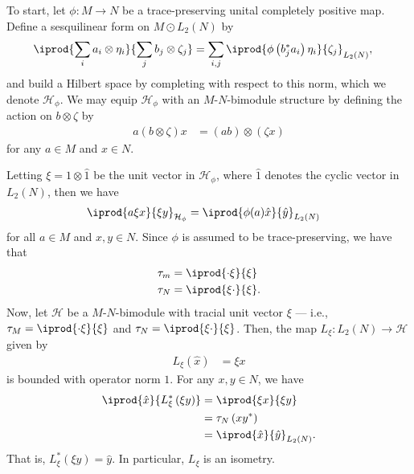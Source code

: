 \documentclass[10pt]{mypackage}
\begin{document}
To start, let $\phi\colon M\rightarrow N$ be a trace-preserving unital completely positive map. Define a sesquilinear form on $M\odot L_2\left( N \right)$ by
\begin{align*}
  \iprod{\sum_{i}a_i\otimes \eta_i}{\sum_{j}b_j\otimes \zeta_j} &= \sum_{i,j} \iprod{\phi\left( b_j^{\ast}a_i \right)\eta_i}{\zeta_j}_{L_2(N)},
\end{align*}
and build a Hilbert space by completing with respect to this norm, which we denote $\mathcal{H}_{\phi}$. We may equip $\mathcal{H}_{\phi}$ with an $M$-$N$-bimodule structure by defining the action on $b\otimes \zeta$ by
\begin{align*}
  a\left( b\otimes \zeta \right)x &= \left( ab \right)\otimes \left( \zeta x \right)
\end{align*}
for any $a\in M$ and $x\in N$.

Letting $\xi = 1\otimes \hat{1}$ be the unit vector in $\mathcal{H}_{\phi}$, where $\hat{1}$ denotes the cyclic vector in $L_2(N)$, then we have
\begin{align*}
  \iprod{a\xi x}{\xi y}_{\mathcal{H}_{\phi}} &= \iprod{\phi(a)\hat{x}}{\hat{y}}_{L_2(N)}
\end{align*}
for all $a\in M$ and $x,y\in N$. Since $\phi$ is assumed to be trace-preserving, we have that
\begin{align*}
  \tau_m &= \iprod{\cdot \xi}{\xi}\\
  \tau_N &= \iprod{\xi \cdot}{\xi}.
\end{align*}
Now, let $\mathcal{H}$ be a $M$-$N$-bimodule with tracial unit vector $\xi$ --- i.e., $\tau_M = \iprod{\cdot \xi}{\xi}$ and $ \tau_N = \iprod{\xi\cdot}{\xi} $. Then, the map $L_{\xi}\colon L_2\left( N \right)\rightarrow \mathcal{H}$ given by
\begin{align*}
  L_{\xi}\left( \hat{x} \right) &= \xi x
\end{align*}
is bounded with operator norm $1$. For any $x,y\in N$, we have
\begin{align*}
  \iprod{\hat{x}}{L_{\xi}^{\ast}\left( \xi y \right)} &= \iprod{\xi x}{\xi y}\\
                                                      &= \tau_N\left( xy^{\ast} \right)\\
                                                      &= \iprod{\hat{x}}{\hat{y}}_{L_2(N)}.
\end{align*}
That is, $L_{\xi}^{\ast}\left( \xi y \right) = \hat{y}$. In particular, $L_{\xi}$ is an isometry.
\end{document}
